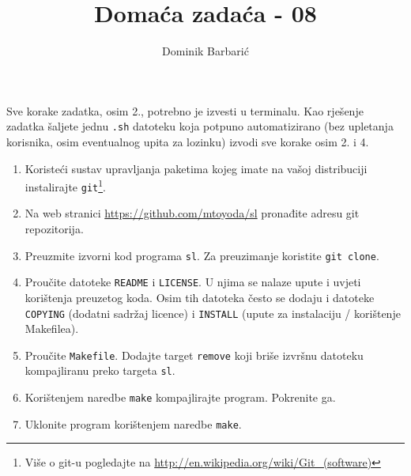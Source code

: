\documentclass[12pt,a4paper]{article}
\newcommand{\shell}[1]{\texttt{#1}}
\begin{document}
	\title{Domaća zadaća - 08}
	\author{Dominik Barbarić}
	\maketitle
	Sve korake zadatka, osim 2., potrebno je izvesti u terminalu. Kao rješenje zadatka šaljete jednu \shell{.sh} datoteku koja potpuno automatizirano (bez upletanja korisnika, osim eventualnog upita za lozinku) izvodi sve korake osim 2. i 4.
	
	\begin{enumerate}
		\item Koristeći sustav upravljanja paketima kojeg imate na vašoj distribuciji instalirajte \shell{git}\footnote{Više o git-u pogledajte na \url{http://en.wikipedia.org/wiki/Git_(software)}}.
		\item Na web stranici \url{https://github.com/mtoyoda/sl} pronađite adresu git repozitorija.
		\item Preuzmite izvorni kod programa \shell{sl}. Za preuzimanje koristite \shell{git clone}.
		\item Proučite datoteke \shell{README} i \shell{LICENSE}. U njima se nalaze upute i uvjeti korištenja preuzetog koda. Osim tih datoteka često se dodaju i datoteke \shell{COPYING} (dodatni sadržaj licence) i \shell{INSTALL} (upute za instalaciju / korištenje Makefilea).
		\item Proučite \shell{Makefile}. Dodajte target \shell{remove} koji briše izvršnu datoteku kompajliranu preko targeta \shell{sl}.
		\item Korištenjem naredbe \shell{make} kompajlirajte program. Pokrenite ga.
		\item Uklonite program korištenjem naredbe \shell{make}.
	\end{enumerate}
\end{document}
